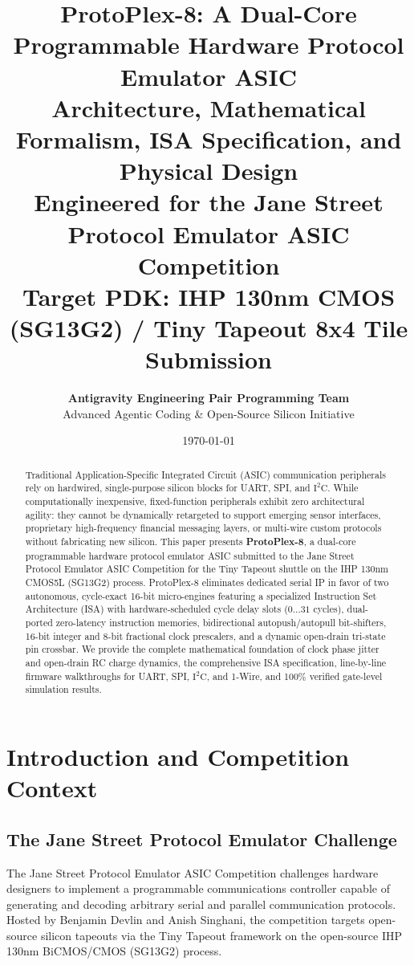 \documentclass[11pt,a4paper]{article}
\title{\textbf{\LARGE ProtoPlex-8: A Dual-Core Programmable Hardware Protocol Emulator ASIC}\\[0.5em]
\large Architecture, Mathematical Formalism, ISA Specification, and Physical Design\\[0.3em]
\normalsize Engineered for the Jane Street Protocol Emulator ASIC Competition\\
Target PDK: IHP 130nm CMOS (SG13G2) / Tiny Tapeout 8x4 Tile Submission}
\author{\textbf{Antigravity Engineering Pair Programming Team}\\
Advanced Agentic Coding \& Open-Source Silicon Initiative}
\date{\today}
\begin{document}
\maketitle

\begin{abstract}
Traditional Application-Specific Integrated Circuit (ASIC) communication peripherals rely on hardwired, single-purpose silicon blocks for UART, SPI, and $\text{I}^2\text{C}$. While computationally inexpensive, fixed-function peripherals exhibit zero architectural agility: they cannot be dynamically retargeted to support emerging sensor interfaces, proprietary high-frequency financial messaging layers, or multi-wire custom protocols without fabricating new silicon. This paper presents \textbf{ProtoPlex-8}, a dual-core programmable hardware protocol emulator ASIC submitted to the Jane Street Protocol Emulator ASIC Competition for the Tiny Tapeout shuttle on the IHP 130nm CMOS5L (SG13G2) process. ProtoPlex-8 eliminates dedicated serial IP in favor of two autonomous, cycle-exact 16-bit micro-engines featuring a specialized Instruction Set Architecture (ISA) with hardware-scheduled cycle delay slots ($0 \dots 31$ cycles), dual-ported zero-latency instruction memories, bidirectional autopush/autopull bit-shifters, 16-bit integer and 8-bit fractional clock prescalers, and a dynamic open-drain tri-state pin crossbar. We provide the complete mathematical foundation of clock phase jitter and open-drain RC charge dynamics, the comprehensive ISA specification, line-by-line firmware walkthroughs for UART, SPI, $\text{I}^2\text{C}$, and 1-Wire, and 100\% verified gate-level simulation results.
\end{abstract}

\tableofcontents
\newpage

\section{Introduction and Competition Context}

\subsection{The Jane Street Protocol Emulator Challenge}
The Jane Street Protocol Emulator ASIC Competition challenges hardware designers to implement a programmable communications controller capable of generating and decoding arbitrary serial and parallel communication protocols. Hosted by Benjamin Devlin and Anish Singhani, the competition targets open-source silicon tapeouts via the Tiny Tapeout framework on the open-source IHP 130nm BiCMOS/CMOS (SG13G2) process.
\end{document}
